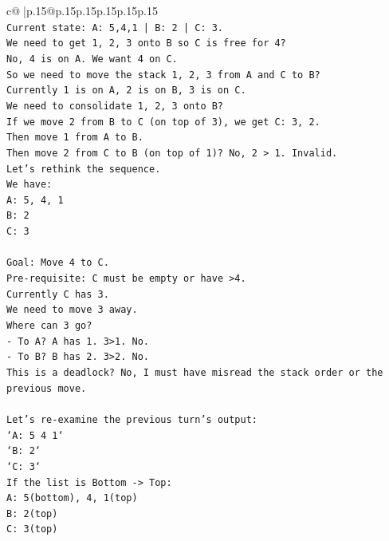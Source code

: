 \documentclass{article}
\begin{document}
{\begin{supertabular}{c@{$\;$}|p{.15\linewidth}@{}p{.15\linewidth}p{.15\linewidth}p{.15\linewidth}p{.15\linewidth}p{.15\linewidth}}
{{{\\ 
\texttt{Current state: A: 5,4,1 | B: 2 | C: 3.} \\
\texttt{We need to get 1, 2, 3 onto B so C is free for 4?} \\
\texttt{No, 4 is on A. We want 4 on C.} \\
\texttt{So we need to move the stack 1, 2, 3 from A and C to B?} \\
\texttt{Currently 1 is on A, 2 is on B, 3 is on C.} \\
\texttt{We need to consolidate 1, 2, 3 onto B?} \\
\texttt{If we move 2 from B to C (on top of 3), we get C: 3, 2.} \\
\texttt{Then move 1 from A to B.} \\
\texttt{Then move 2 from C to B (on top of 1)? No, 2 > 1. Invalid.} \\
\texttt{Let's rethink the sequence.} \\
\texttt{We have:} \\
\texttt{A: 5, 4, 1} \\
\texttt{B: 2} \\
\texttt{C: 3} \\
\\ 
\texttt{Goal: Move 4 to C.} \\
\texttt{Pre{-}requisite: C must be empty or have >4.} \\
\texttt{Currently C has 3.} \\
\texttt{We need to move 3 away.} \\
\texttt{Where can 3 go?} \\
\texttt{{-} To A? A has 1. 3>1. No.} \\
\texttt{{-} To B? B has 2. 3>2. No.} \\
\texttt{This is a deadlock? No, I must have misread the stack order or the previous move.} \\
\\ 
\texttt{Let's re{-}examine the previous turn's output:} \\
\texttt{`A: 5 4 1`} \\
\texttt{`B: 2`} \\
\texttt{`C: 3`} \\
\texttt{If the list is Bottom {-}> Top:} \\
\texttt{A: 5(bottom), 4, 1(top)} \\
\texttt{B: 2(top)} \\
\texttt{C: 3(top)} \\
\\ 
}}}
\end{supertabular}}
\end{document}
